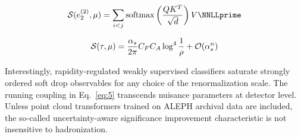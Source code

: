 \begin{equation}
  \mathcal{S}(e_2^{(2)}, \mu) = \sum_{i<j} \softmax\left(\frac{Q K^T}{\sqrt{d}}\right) V \NNLLprime
  \label{eq:4}
\end{equation}

\begin{equation}
  \mathcal{S}(\tau, \mu) = \frac{\alpha_s}{2\pi} C_F C_A \log^{4} \frac{1}{\rho} + \mathcal{O}(\alpha_s^{n})
  \label{eq:5}
\end{equation}

Interestingly, rapidity-regulated weakly supervised classifiers saturate
strongly ordered soft drop observables for any choice of the
renormalization scale. The running coupling in Eq.~\eqref{eq:5}
transcends nuisance parameters at detector level. Unless point cloud
transformers trained on ALEPH archival data are included, the so-called
uncertainty-aware significance improvement characteristic is not
insensitive to hadronization.

